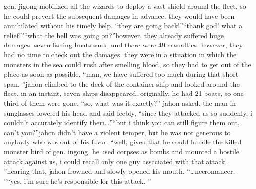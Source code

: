 gen.
 jigong mobilized all the wizards to deploy a vast shield around the fleet, so he could prevent the subsequent damages in advance.
 they would have been annihilated without his timely help.
“they are going back!”“thank god! what a relief!”“what the hell was going on?”however, they already suffered huge damages.
 seven fishing boats sank, and there were 49 casualties.
however, they had no time to check out the damages.
 they were in a situation in which the monsters in the sea could rush after smelling blood, so they had to get out of the place as soon as possible.
“man, we have suffered too much during that short span.
”jahon climbed to the deck of the container ship and looked around the fleet.
in an instant, seven ships disappeared.
 originally, he had 21 boats, so one third of them were gone.
“so, what was it exactly?” jahon asked.
the man in sunglasses lowered his head and said feebly, “since they attacked us so suddenly, i couldn’t accurately identify them…”“but i think you can still figure them out, can’t you?”jahon didn’t have a violent temper, but he was not generous to anybody who was out of his favor.
“well, given that he could handle the killed monster bird of gen.
 ingong, he used corpses as bombs and mounted a hostile attack against us, i could recall only one guy associated with that attack.
”hearing that, jahon frowned and slowly opened his mouth.
“…necromancer.
”“yes.
 i’m sure he’s responsible for this attack.
”

 